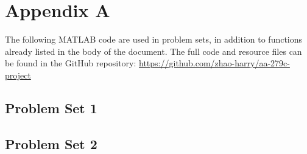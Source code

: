 \appendix

\section{Appendix A}
The following MATLAB code are used in problem sets, in addition to functions already listed in the body of the document. The full code and resource files can be found in the GitHub repository: \url{https://github.com/zhao-harry/aa-279c-project}

\subsection{Problem Set 1}


\subsection{Problem Set 2}





